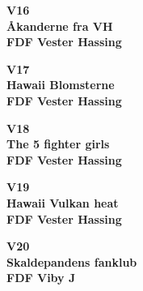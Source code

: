 \vspace*{2cm}
\begin{center}
{\fontsize{300}{60}\selectfont\textbf{\textcolor{søblå}{V16}}\\}
{\fontsize{30}{50}\selectfont\textbf{\textcolor{søblå}{Åkanderne fra VH}}\\}
{\fontsize{20}{50}\selectfont\textbf{FDF Vester Hassing}\\}
\end{center}
\newpage

\vspace*{2cm}
\begin{center}
{\fontsize{300}{60}\selectfont\textbf{\textcolor{søblå}{V17}}\\}
{\fontsize{30}{50}\selectfont\textbf{\textcolor{søblå}{Hawaii Blomsterne}}\\}
{\fontsize{20}{50}\selectfont\textbf{FDF Vester Hassing}\\}
\end{center}
\newpage

\vspace*{2cm}
\begin{center}
{\fontsize{300}{60}\selectfont\textbf{\textcolor{søblå}{V18}}\\}
{\fontsize{30}{50}\selectfont\textbf{\textcolor{søblå}{The 5 fighter girls}}\\}
{\fontsize{20}{50}\selectfont\textbf{FDF Vester Hassing}\\}
\end{center}
\newpage

\vspace*{2cm}
\begin{center}
{\fontsize{300}{60}\selectfont\textbf{\textcolor{søblå}{V19}}\\}
{\fontsize{30}{50}\selectfont\textbf{\textcolor{søblå}{Hawaii Vulkan heat}}\\}
{\fontsize{20}{50}\selectfont\textbf{FDF Vester Hassing}\\}
\end{center}
\newpage

\vspace*{2cm}
\begin{center}
{\fontsize{300}{60}\selectfont\textbf{\textcolor{søblå}{V20}}\\}
{\fontsize{30}{50}\selectfont\textbf{\textcolor{søblå}{Skaldepandens fanklub}}\\}
{\fontsize{20}{50}\selectfont\textbf{FDF Viby J}\\}
\end{center}
\newpage

